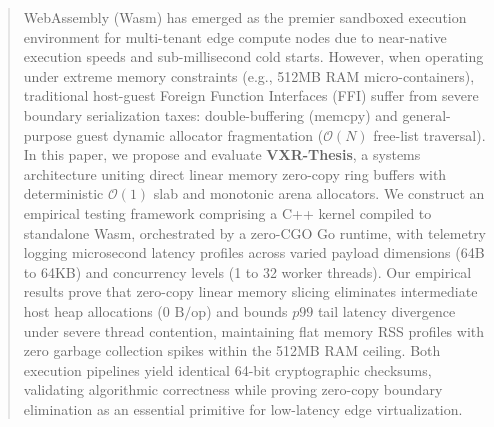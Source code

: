 \begin{abstract}
WebAssembly (Wasm) has emerged as the premier sandboxed execution environment for multi-tenant edge compute nodes due to near-native execution speeds and sub-millisecond cold starts. However, when operating under extreme memory constraints (e.g., 512MB RAM micro-containers), traditional host-guest Foreign Function Interfaces (FFI) suffer from severe boundary serialization taxes: double-buffering ($\text{memcpy}$) and general-purpose guest dynamic allocator fragmentation ($\mathcal{O}(N)$ free-list traversal). In this paper, we propose and evaluate \textbf{VXR-Thesis}, a systems architecture uniting direct linear memory zero-copy ring buffers with deterministic $\mathcal{O}(1)$ slab and monotonic arena allocators. We construct an empirical testing framework comprising a C++ kernel compiled to standalone Wasm, orchestrated by a zero-CGO Go runtime, with telemetry logging microsecond latency profiles across varied payload dimensions (64B to 64KB) and concurrency levels (1 to 32 worker threads). Our empirical results prove that zero-copy linear memory slicing eliminates intermediate host heap allocations ($0\text{ B/op}$) and bounds $p99$ tail latency divergence under severe thread contention, maintaining flat memory RSS profiles with zero garbage collection spikes within the 512MB RAM ceiling. Both execution pipelines yield identical 64-bit cryptographic checksums, validating algorithmic correctness while proving zero-copy boundary elimination as an essential primitive for low-latency edge virtualization.
\end{abstract}

